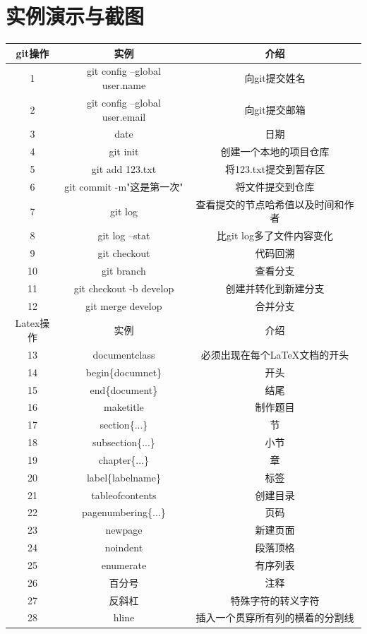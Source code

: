 \documentclass[a4paper, 12pt]{article}
\begin{document}
	\section{实例演示与截图}      %
	\begin{tabular}[l]{|c|c|c|}   %
		\hline
		git操作 &实例       & 介绍    \\
		\hline
		1  & git config --global user.name  & 向git提交姓名 \\
		\hline
		2  & git config --global user.email& 向git提交邮箱 \\
		\hline
		3  & date & 日期 \\
		\hline
		4  & git init & 创建一个本地的项目仓库 \\
		\hline
		5  & git add 123.txt  & 将123.txt提交到暂存区 \\
		\hline
		6  & git commit -m"这是第一次" & 将文件提交到仓库 \\
		\hline
		7  & git log  & 查看提交的节点哈希值以及时间和作者 \\
		\hline
		8 & git log --stat & 比git log多了文件内容变化 \\
		\hline
		9 & git checkout & 代码回溯 \\
		\hline
		10 & git branch & 查看分支 \\
		\hline
		11 & git checkout -b develop & 创建并转化到新建分支 \\
		\hline
		12 & git merge develop& 合并分支 \\
		\hline
		Latex操作 & 实例 &介绍 \\
		\hline
		13 & documentclass & 必须出现在每个LaTeX文档的开头  \\
		\hline
		14 & begin\{documnet\}  &  开头   \\
		\hline
		15 & end\{document\} & 结尾 \\
		\hline
		16 & maketitle & 制作题目 \\
		\hline
		17 & section\{...\} & 节 \\
		\hline
		18 & subsection\{...\} & 小节 \\
		\hline
		19 & chapter\{...\} & 章 \\
		\hline
		20 & label\{labelname\} & 标签 \\
		\hline
		21 & tableofcontents & 创建目录 \\
		\hline
		22 & pagenumbering\{...\} & 页码 \\
		\hline
		23 & newpage & 新建页面 \\
		\hline
		24 & noindent & 段落顶格 \\
		\hline
		25 & enumerate & 有序列表 \\
		\hline
		26 & 百分号 & 注释 \\
		\hline
		27 & 反斜杠   & 特殊字符的转义字符 \\
		\hline
		28 & hline & 插入一个贯穿所有列的横着的分割线 \\
		\hline
		\end{tabular}
\end{document}
